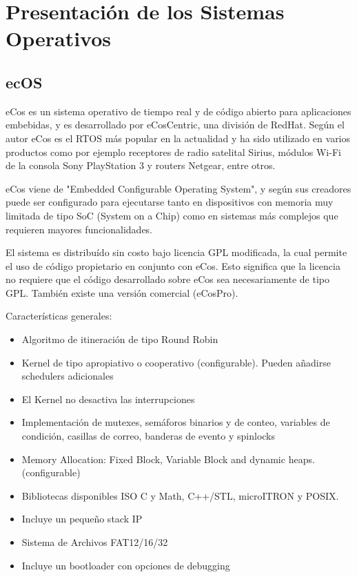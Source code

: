  	

		\section{Presentación de los Sistemas Operativos}
 		
			 	\subsection{ecOS}

eCos \cite{Etiqueta35} es un sistema operativo de tiempo real y de código abierto para aplicaciones embebidas, y es desarrollado por eCosCentric, una división de RedHat. Según el autor eCos es el RTOS más popular en la actualidad y ha sido utilizado en varios productos como 
por ejemplo receptores de radio satelital Sirius, módulos Wi-Fi de la consola Sony PlayStation 3 
y routers Netgear, entre otros. 


 eCos viene de "Embedded Configurable Operating System", y según sus creadores puede ser configurado para ejecutarse tanto en dispositivos con memoria muy limitada de tipo SoC (System on a Chip) como en sistemas más complejos que requieren mayores funcionalidades. 
 
El sistema es distribuído sin costo bajo licencia GPL modificada, la cual permite el uso de código propietario en conjunto con eCos. Esto significa que la licencia no requiere que el código desarrollado sobre eCos sea necesariamente de tipo GPL. También existe una versión comercial 
(eCosPro).

Características generales: 
				\begin{itemize}
				  	\item Algoritmo de itineración de tipo Round Robin
					\item Kernel de tipo apropiativo o cooperativo (configurable). Pueden añadirse schedulers 
 adicionales
					\item El Kernel no desactiva las interrupciones
					\item Implementación de mutexes, semáforos binarios y de conteo, variables de condición, 
 casillas de correo, banderas de evento y spinlocks
					\item Memory Allocation: Fixed Block, Variable Block and dynamic heaps. (configurable)
					\item Bibliotecas disponibles ISO C y Math, C++/STL, microITRON y POSIX. 
					\item  Incluye un pequeño stack IP
					\item Sistema de Archivos FAT12/16/32
					\item Incluye un bootloader con opciones de debugging
				\end{itemize}			

